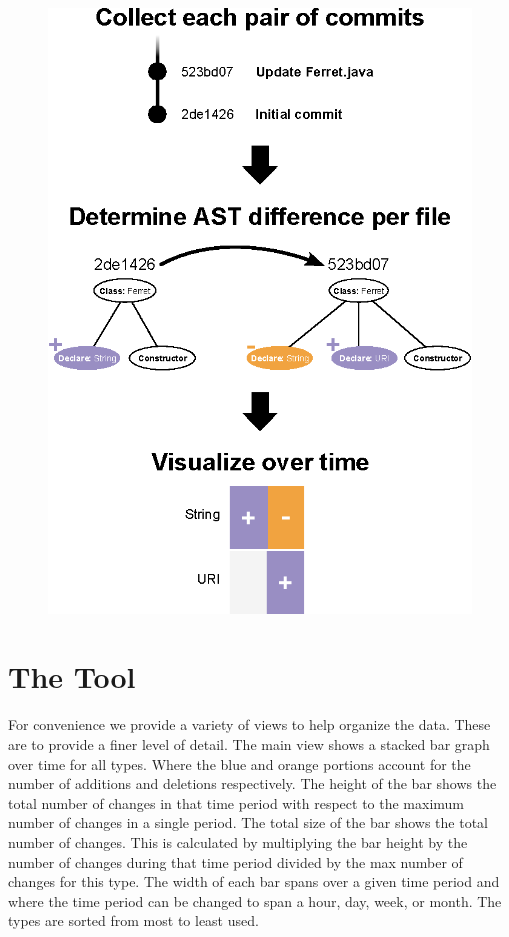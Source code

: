 \documentclass[conference]{IEEEtran}
\begin{document}
\begin{figure}[!h]
\centering
\includegraphics[width=\columnwidth]{context}
\caption{}
\end{figure}

\section{The Tool}
For convenience we provide a variety of views to help organize the data. These are to provide a finer level of detail. The main view shows a stacked bar graph over time for all types. Where the blue and orange portions account for the number of additions and deletions respectively. The height of the bar shows the total number of changes in that time period with respect to the maximum number of changes in a single period.  The total size of the bar shows the total number of changes. This is calculated by multiplying the bar height by the number of changes during that time period divided by the max number of changes for this type. The width of each bar spans over a given time period and where the time period can be changed to span a hour, day, week, or month. The types are sorted from most to least used.
\end{document}
